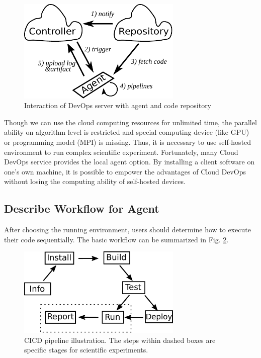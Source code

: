 \documentclass[10pt, conference, compsocconf]{IEEEtran}
\begin{document}
\begin{figure}[!ht]
\includegraphics[width=18.5pc]{principal.pdf}
\caption{Interaction of DevOps server with agent and code repository}\label{fig:principal}
\end{figure}

Though we can use the cloud computing resources for unlimited time, the parallel ability on algorithm level is restricted and special computing device (like GPU) or programming model (MPI) is missing. Thus, it is necessary to use self-hosted environment to run complex scientific experiment. Fortunately, many Cloud DevOps service provides the local agent option. By installing a client software on one's own machine, it is possible to empower the advantages of Cloud DevOps without losing the computing ability of self-hosted devices.
\subsection{Describe Workflow for Agent}
After choosing the running environment, users should determine how to execute their code sequentially. The basic workflow can be summarized in Fig. \ref{fig:cicdworkflow}.

\begin{figure}[!ht]
\includegraphics[width=18.5pc]{workflow.pdf}
\caption{CICD pipeline illustration. The steps within dashed boxes are specific stages for scientific experiments. }\label{fig:cicdworkflow}
\end{figure}
\end{document}
